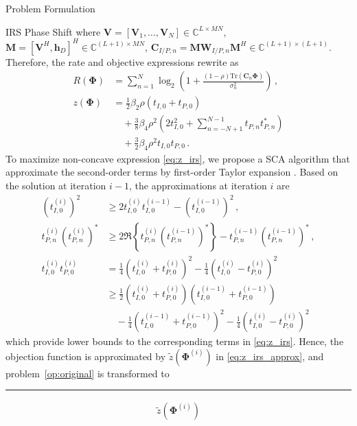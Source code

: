 \documentclass[journal]{IEEEtran}
\begin{document}
\begin{section}{Problem Formulation}
\begin{subsection}{IRS Phase Shift}
			where $\boldsymbol{V}=[\boldsymbol{V}_1,\dots,\boldsymbol{V}_N] \in \mathbb{C}^{L \times MN}$, $\boldsymbol{M}=[\boldsymbol{V}^H, \boldsymbol{h}_{D}]^H \in \mathbb{C}^{(L+1) \times MN}$, $\boldsymbol{C}_{I/P,n}=\boldsymbol{M}\boldsymbol{W}_{I/P,n}\boldsymbol{M}^H \in \mathbb{C}^{(L+1)\times(L+1)}$. Therefore, the rate and objective expressions rewrite as
			\begin{align}
				R(\boldsymbol{\Phi})
				& = \sum_{n=1}^{N}{\log_2\left(1+\frac{(1-\rho)\mathrm{Tr}(\boldsymbol{C}_n\boldsymbol{\Phi})}{\sigma_n^2}\right)}\,,\label{eq:R_irs}\\
				z(\boldsymbol{\Phi})
				& = \frac{1}{2}{\beta_2}{\rho}(t_{I,0}+t_{P,0})\nonumber\\
				& \quad + \frac{3}{8}{\beta_4}{\rho^2} \left(2t_{I,0}^2 + \sum_{n=-N+1}^{N-1}{t_{P,n}t_{P,n}^*}\right)\nonumber\\
				& \quad + \frac{3}{2}{\beta_4}{\rho^2}t_{I,0}t_{P,0}\,.\label{eq:z_irs}
			\end{align}
			To maximize non-concave expression \ref{eq:z_irs}, we propose a SCA algorithm that approximate the second-order terms by first-order Taylor expansion \cite{Adali2010}. Based on the solution at iteration $i - 1$, the approximations at iteration $i$ are
			\begin{align}
				(t_{I,0}^{(i)})^2
				& \ge 2 t_{I,0}^{(i)}t_{I,0}^{(i-1)} - (t_{I,0}^{(i-1)})^2\,,\label{eq:taylor_1}\\
				t_{P,n}^{(i)} (t_{P,n}^{(i)})^*
				& \ge 2 \Re\left\{t_{P,n}^{(i)} (t_{P,n}^{(i-1)})^*\right\} - t_{P,n}^{(i-1)} (t_{P,n}^{(i-1)})^*\,,\label{eq:taylor_2}\\
				t_{I,0}^{(i)} t_{P,0}^{(i)}
				& = \frac{1}{4}(t_{I,0}^{(i)} + t_{P,0}^{(i)})^2 - \frac{1}{4}(t_{I,0}^{(i)} - t_{P,0}^{(i)})^2\nonumber\\
				& \ge \frac{1}{2}(t_{I,0}^{(i)} + t_{P,0}^{(i)})(t_{I,0}^{(i-1)} + t_{P,0}^{(i-1)})\nonumber\\
				& \quad - \frac{1}{4}(t_{I,0}^{(i-1)} + t_{P,0}^{(i-1)})^2 - \frac{1}{4}(t_{I,0}^{(i)} - t_{P,0}^{(i)})^2\label{eq:taylor_3}
			\end{align}
			which provide lower bounds to the corresponding terms in \ref{eq:z_irs}. Hence, the objection function is approximated by $\tilde{z}(\boldsymbol{\Phi}^{(i)})$ in \ref{eq:z_irs_approx}, and problem~\ref{op:original} is transformed to
			\begin{figure*}[b]
				\hrule
				\begin{align}
					\tilde{z}(\boldsymbol{\Phi}^{(i)})

\end{align}
\end{figure*}
\end{subsection}
\end{section}
\end{document}
